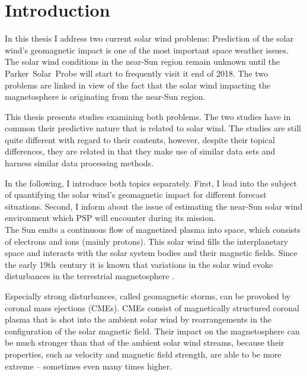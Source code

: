 
\chapter{Introduction}
\label{chap:introduction}


In this thesis I address two current solar wind problems: Prediction of the solar wind's geomagnetic impact is one of the most important space weather issues. The solar wind conditions in the near-Sun region remain unknown until the Parker~Solar~Probe will start to frequently visit it end of 2018. The two problems are linked in view of the fact that the solar wind impacting the magnetosphere is originating from the near-Sun region.

This thesis presents studies examining both problems. The two studies have in common their predictive nature that is related to solar wind. The studies are still quite different with regard to their contents, however, despite their topical differences, they are related in that they make use of similar data sets and harness similar data processing methods.

In the following, I introduce both topics separately. First, I lead into the subject of quantifying the solar wind's geomagnetic impact for different forecast situations. Second, I inform about the issue of estimating the near-Sun solar wind environment which PSP will encounter during its mission.\\



The Sun emits a continuous flow of magnetized plasma into space, which consists of electrons and ions (mainly protons). This solar wind fills the interplanetary space and interacts with the solar system bodies and their magnetic fields. Since the early 19th~century it is known that variations in the solar wind evoke disturbances in the terrestrial magnetosphere \citep{Bartels1962}.

Especially strong disturbances, called geomagnetic storms, can be provoked by coronal mass ejections (CMEs). CMEs consist of magnetically structured coronal plasma that is shot into the ambient solar wind by rearrangements in the configuration of the solar magnetic field. Their impact on the magnetosphere can be much stronger than that of the ambient solar wind streams, because their properties, such as velocity and magnetic field strength, are able to be more extreme -- sometimes even many times higher.

